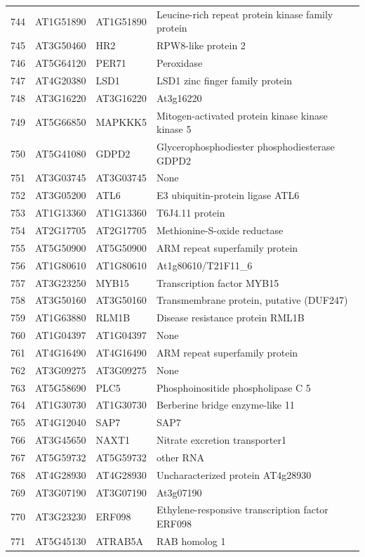 \documentclass[11pt]{article}
\begin{document}
\begin{center}
\begin{tabular}{rlll}
744 & AT1G51890 & AT1G51890 & Leucine-rich repeat protein kinase family protein\\
745 & AT3G50460 & HR2 & RPW8-like protein 2\\
746 & AT5G64120 & PER71 & Peroxidase\\
747 & AT4G20380 & LSD1 & LSD1 zinc finger family protein\\
748 & AT3G16220 & AT3G16220 & At3g16220\\
749 & AT5G66850 & MAPKKK5 & Mitogen-activated protein kinase kinase kinase 5\\
750 & AT5G41080 & GDPD2 & Glycerophosphodiester phosphodiesterase GDPD2\\
751 & AT3G03745 & AT3G03745 & None\\
752 & AT3G05200 & ATL6 & E3 ubiquitin-protein ligase ATL6\\
753 & AT1G13360 & AT1G13360 & T6J4.11 protein\\
754 & AT2G17705 & AT2G17705 & Methionine-S-oxide reductase\\
755 & AT5G50900 & AT5G50900 & ARM repeat superfamily protein\\
756 & AT1G80610 & AT1G80610 & At1g80610/T21F11\_6\\
757 & AT3G23250 & MYB15 & Transcription factor MYB15\\
758 & AT3G50160 & AT3G50160 & Transmembrane protein, putative (DUF247)\\
759 & AT1G63880 & RLM1B & Disease resistance protein RML1B\\
760 & AT1G04397 & AT1G04397 & None\\
761 & AT4G16490 & AT4G16490 & ARM repeat superfamily protein\\
762 & AT3G09275 & AT3G09275 & None\\
763 & AT5G58690 & PLC5 & Phosphoinositide phospholipase C 5\\
764 & AT1G30730 & AT1G30730 & Berberine bridge enzyme-like 11\\
765 & AT4G12040 & SAP7 & SAP7\\
766 & AT3G45650 & NAXT1 & Nitrate excretion transporter1\\
767 & AT5G59732 & AT5G59732 & other RNA\\
768 & AT4G28930 & AT4G28930 & Uncharacterized protein AT4g28930\\
769 & AT3G07190 & AT3G07190 & At3g07190\\
770 & AT3G23230 & ERF098 & Ethylene-responsive transcription factor ERF098\\
771 & AT5G45130 & ATRAB5A & RAB homolog 1\\

\end{tabular}
\end{center}
\end{document}
